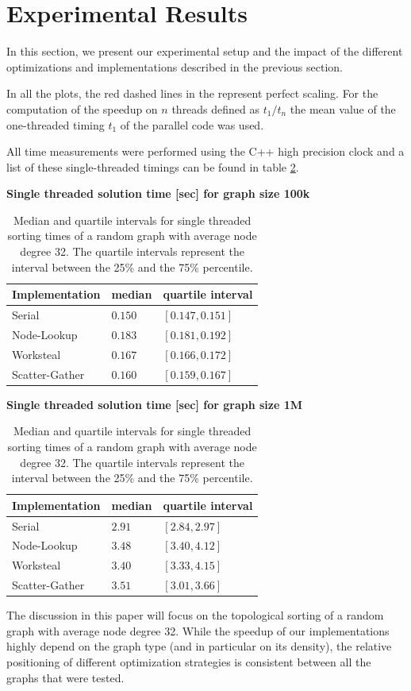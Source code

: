 \section{Experimental Results}\label{sec:exp}
%
In this section, we present our experimental setup and the impact of the different optimizations and implementations described in the previous section.

In all the plots, the red dashed lines in the represent perfect scaling.
For the computation of the speedup on $n$ threads defined as $t_1/t_n$ the mean value of the one-threaded timing $t_1$ of the parallel code was used.

All time measurements were performed using the C++ high precision clock and a list of these single-threaded timings can be found in table \ref{tab:t1timings}.
\par\medskip

  \begin{table}[h]
	  \textbf{Single threaded solution time [sec] for graph size 100k}
    \centering
    \begin{tabular}{lll}
		Implementation	& median & quartile interval \\
    \toprule
	Serial				& $0.150$ & $[0.147,0.151]$ \\
	Node-Lookup			& $0.183$ & $[0.181,0.192]$ \\
	Worksteal			& $0.167$ & $[0.166,0.172]$ \\
	Scatter-Gather		& $0.160$ & $[0.159,0.167]$ \\
    \bottomrule
    \end{tabular}
    \par\medskip
	  \textbf{Single threaded solution time [sec] for graph size 1M}
    \centering
    \begin{tabular}{lll}
		Implementation	& median & quartile interval \\
    \toprule
	Serial				& $2.91$ & $[2.84,2.97]$ \\
	Node-Lookup			& $3.48$ & $[3.40,4.12]$ \\
	Worksteal			& $3.40$ & $[3.33,4.15]$ \\
	Scatter-Gather		& $3.51$ & $[3.01,3.66]$ \\
    \bottomrule
    \end{tabular}
    \par\medskip
    \caption{Median and quartile intervals for single threaded sorting times of a random graph with average node degree 32. The quartile intervals represent the interval between the 25\% and the 75\% percentile.}
    \label{tab:t1timings}
  \end{table}
\par\medskip
The discussion in this paper will focus on the topological sorting of a random graph with average node degree 32.
While the speedup of our implementations highly depend on the graph type (and in particular on its density), the relative positioning of different optimization strategies is consistent between all the graphs that were tested.


